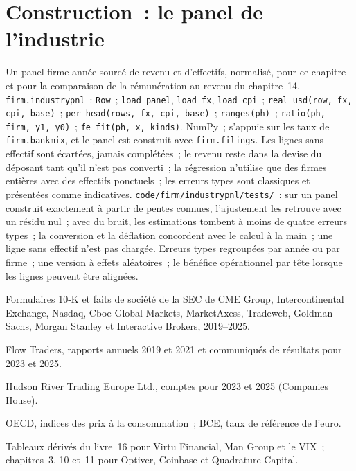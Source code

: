 \section{Construction~: le panel de l'industrie}\label{bld:in:revenue-and-profit-across-the-industry:industrypnl}

\begin{build}
 Un panel firme-année sourcé de revenu et d'effectifs, normalisé, pour ce chapitre et pour
la comparaison de la rémunération au revenu du chapitre~14.
 \texttt{firm.industrypnl}~: \texttt{Row}~; \texttt{load\_panel}, \texttt{load\_fx},
\texttt{load\_cpi}~; \texttt{real\_usd(row, fx, cpi, base)}~; \texttt{per\_head(rows, fx, cpi, base)}~;
\texttt{ranges(ph)}~; \texttt{ratio(ph, firm, y1, y0)}~; \texttt{fe\_fit(ph, x, kinds)}. NumPy~;
s'appuie sur les taux de \texttt{firm.bankmix}, et le panel est construit avec \texttt{firm.filings}.
 Les lignes sans effectif sont écartées, jamais complétées~; le revenu reste dans la devise du déposant tant qu'il n'est pas converti~;
la régression n'utilise que des firmes entières avec des effectifs ponctuels~; les erreurs types sont classiques et présentées comme indicatives.
 \texttt{code/firm/industrypnl/tests/}~: sur un panel construit exactement à partir de pentes connues, l'ajustement
les retrouve avec un résidu nul~; avec du bruit, les estimations tombent à moins de quatre erreurs types~; la conversion et
la déflation concordent avec le calcul à la main~; une ligne sans effectif n'est pas chargée.
 Erreurs types regroupées par année ou par firme~; une version à effets aléatoires~; le bénéfice opérationnel par tête
lorsque les lignes peuvent être alignées.
\end{build}

\begin{omsources}
\item Formulaires 10-K et faits de société de la SEC de CME Group, Intercontinental Exchange, Nasdaq, Cboe Global Markets,
MarketAxess, Tradeweb, Goldman Sachs, Morgan Stanley et Interactive Brokers, 2019--2025.
\item Flow Traders, rapports annuels 2019 et 2021 et communiqués de résultats pour 2023 et 2025.
\item Hudson River Trading Europe Ltd., comptes pour 2023 et 2025 (Companies House).
\item OECD, indices des prix à la consommation~; BCE, taux de référence de l'euro.
\item Tableaux dérivés du livre~16 pour Virtu Financial, Man Group et le VIX~; chapitres~3, 10 et~11 pour Optiver, Coinbase
et Quadrature Capital.
\end{omsources}

